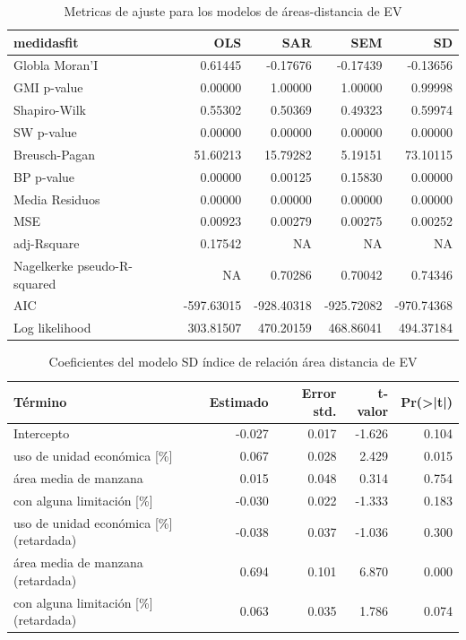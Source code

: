 \documentclass[12pt,a4paper,oneside, openany]{book}
\theoremstyle{definition}
\theoremstyle{definition}
\theoremstyle{definition}
\theoremstyle{remark}
\begin{document}
\begin{table}[H]

\caption{\label{tab:tabla-comp-modelos-areasdist}Metricas de ajuste para los modelos de áreas-distancia de EV}
\centering
\begin{tabular}{lrrrr}
\toprule
medidasfit & OLS & SAR & SEM & SD\\
\midrule
Globla Moran'I & 0.61445 & -0.17676 & -0.17439 & -0.13656\\
GMI p-value & 0.00000 & 1.00000 & 1.00000 & 0.99998\\
Shapiro-Wilk & 0.55302 & 0.50369 & 0.49323 & 0.59974\\
SW p-value & 0.00000 & 0.00000 & 0.00000 & 0.00000\\
Breusch-Pagan & 51.60213 & 15.79282 & 5.19151 & 73.10115\\
\addlinespace
BP p-value & 0.00000 & 0.00125 & 0.15830 & 0.00000\\
Media Residuos & 0.00000 & 0.00000 & 0.00000 & 0.00000\\
MSE & 0.00923 & 0.00279 & 0.00275 & 0.00252\\
adj-Rsquare & 0.17542 & NA & NA & NA\\
Nagelkerke pseudo-R-squared & NA & 0.70286 & 0.70042 & 0.74346\\
\addlinespace
AIC & -597.63015 & -928.40318 & -925.72082 & -970.74368\\
Log likelihood & 303.81507 & 470.20159 & 468.86041 & 494.37184\\
\bottomrule
\end{tabular}
\end{table}

\begin{table}[H]

\caption{\label{tab:coef-sd-areasdist}Coeficientes del modelo SD índice de relación área distancia de EV}
\centering
\begin{tabular}{lrrrr}
\toprule
Término & Estimado & Error std. & t-valor & Pr(>|t|)\\
\midrule
Intercepto & -0.027 & 0.017 & -1.626 & 0.104\\
uso de unidad económica [\%] & 0.067 & 0.028 & 2.429 & 0.015\\
área media de manzana & 0.015 & 0.048 & 0.314 & 0.754\\
con alguna limitación [\%] & -0.030 & 0.022 & -1.333 & 0.183\\
uso de unidad económica [\%] (retardada) & -0.038 & 0.037 & -1.036 & 0.300\\
\addlinespace
área media de manzana (retardada) & 0.694 & 0.101 & 6.870 & 0.000\\
con alguna limitación [\%] (retardada) & 0.063 & 0.035 & 1.786 & 0.074\\
\bottomrule
\end{tabular}
\end{table}
\end{document}
